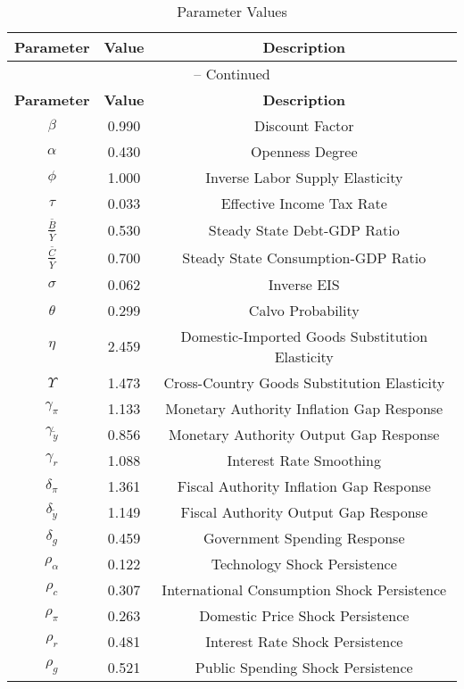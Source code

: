 \begin{center}
\begin{longtable}{ccc}
\caption{Parameter Values}\\%
\toprule%
\multicolumn{1}{c}{\textbf{Parameter}} &
\multicolumn{1}{c}{\textbf{Value}} &
 \multicolumn{1}{c}{\textbf{Description}}\\%
\midrule%
\endfirsthead
\multicolumn{3}{c}{{\tablename} \thetable{} -- Continued}\\%
\midrule%
\multicolumn{1}{c}{\textbf{Parameter}} &
\multicolumn{1}{c}{\textbf{Value}} &
  \multicolumn{1}{c}{\textbf{Description}}\\%
\midrule%
\endhead
$\beta$ 	 & 	 0.990 	 & 	 Discount Factor\\
$\alpha$ 	 & 	 0.430 	 & 	 Openness Degree\\
$\phi$ 	 & 	 1.000 	 & 	 Inverse Labor Supply Elasticity\\
$\tau$ 	 & 	 0.033 	 & 	 Effective Income Tax Rate\\
$\frac{\bar{B}}{\bar{Y}}$ 	 & 	 0.530 	 & 	 Steady State Debt-GDP Ratio\\
$\frac{\bar{C}}{\bar{Y}}$ 	 & 	 0.700 	 & 	 Steady State Consumption-GDP Ratio\\
$\sigma$ 	 & 	 0.062 	 & 	 Inverse EIS\\
$\theta$ 	 & 	 0.299 	 & 	 Calvo Probability\\
$\eta$ 	 & 	 2.459 	 & 	 Domestic-Imported Goods Substitution Elasticity\\
$\Upsilon$ 	 & 	 1.473 	 & 	 Cross-Country Goods Substitution Elasticity\\
$\gamma_{\pi}$ 	 & 	 1.133 	 & 	 Monetary Authority Inflation Gap Response\\
$\gamma_{\tilde{y}}$ 	 & 	 0.856 	 & 	 Monetary Authority Output Gap Response\\
$\gamma_{r}$ 	 & 	 1.088 	 & 	 Interest Rate Smoothing\\
$\delta_{\pi}$ 	 & 	 1.361 	 & 	 Fiscal Authority Inflation Gap Response\\
$\delta_{\tilde{y}}$ 	 & 	 1.149 	 & 	 Fiscal Authority Output Gap Response\\
$\delta_{g}$ 	 & 	 0.459 	 & 	 Government Spending Response\\
$\rho_{\alpha}$ 	 & 	 0.122 	 & 	 Technology Shock Persistence\\
$\rho_{c}$ 	 & 	 0.307 	 & 	 International Consumption Shock Persistence\\
$\rho_{\pi}$ 	 & 	 0.263 	 & 	 Domestic Price Shock Persistence\\
$\rho_{r}$ 	 & 	 0.481 	 & 	 Interest Rate Shock Persistence\\
$\rho_{g}$ 	 & 	 0.521 	 & 	 Public Spending Shock Persistence\\
\bottomrule%
\end{longtable}
\end{center}

